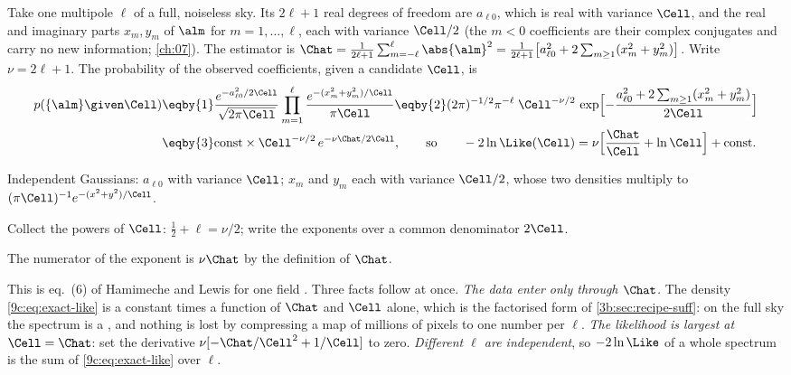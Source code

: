 Take one multipole $\ell$ of a full, noiseless sky. Its $2\ell+1$ real degrees of freedom are $a_{\ell0}$,
which is real with variance $\Cell$, and the real and imaginary parts $x_m,y_m$ of $\alm$ for
$m=1,\dots,\ell$, each with variance $\Cell/2$ (the $m<0$ coefficients are their complex conjugates and
carry no new information; \cref{ch:07}). The estimator is
$\Chat=\frac1{2\ell+1}\sum_{m=-\ell}^{\ell}\abs{\alm}^2=\frac{1}{2\ell+1}\bigl[a_{\ell0}^2+2\sum_{m\ge1}(x_m^2+y_m^2)\bigr]$.
Write $\nu=2\ell+1$. The probability of the observed coefficients, given a candidate $\Cell$, is
\begin{align}
  p(\{\alm\}\given\Cell)
  &\eqby{1}\frac{e^{-a_{\ell0}^2/2\Cell}}{\sqrt{2\pi\Cell}}\prod_{m=1}^{\ell}
     \frac{e^{-(x_m^2+y_m^2)/\Cell}}{\pi\Cell}
   \eqby{2}(2\pi)^{-1/2}\pi^{-\ell}\;\Cell^{-\nu/2}\,
     \exp\Bigl[-\frac{a_{\ell0}^2+2\sum_{m\ge1}(x_m^2+y_m^2)}{2\Cell}\Bigr]
   \nonumber\\
  &\eqby{3}\text{const}\times\Cell^{-\nu/2}\,e^{-\nu\Chat/2\Cell},
  \qquad\text{so}\qquad
  -2\ln\Like(\Cell)=\nu\Bigl[\frac{\Chat}{\Cell}+\ln\Cell\Bigr]+\text{const}.
  \label{9c:eq:exact-like}
\end{align}
\begin{explain}
  \item Independent Gaussians: $a_{\ell0}$ with variance $\Cell$; $x_m$ and $y_m$ each with variance
        $\Cell/2$, whose two densities multiply to $(\pi\Cell)^{-1}e^{-(x^2+y^2)/\Cell}$.
  \item Collect the powers of $\Cell$: $\tfrac12+\ell=\nu/2$; write the exponents over a common
        denominator $2\Cell$.
  \item The numerator of the exponent is $\nu\Chat$ by the definition of $\Chat$.
\end{explain}
This is eq.~(6) of Hamimeche and Lewis for one field \cite{HamimecheLewis2008}. Three facts follow at
once. \emph{The data enter only through $\Chat$.} The density \eqref{9c:eq:exact-like} is a constant times a
function of $\Chat$ and $\Cell$ alone, which is the factorised form of \cref{3b:sec:recipe-suff}: on the full
sky the spectrum is a  , and nothing is lost by compressing a map of millions of pixels to one number per
$\ell$. \emph{The likelihood is largest at $\Cell=\Chat$}: set the derivative $\nu[-\Chat/\Cell^2+1/\Cell]$ to
zero. \emph{Different $\ell$ are independent}, so $-2\ln\Like$ of a whole spectrum is the sum of
\eqref{9c:eq:exact-like} over $\ell$.

